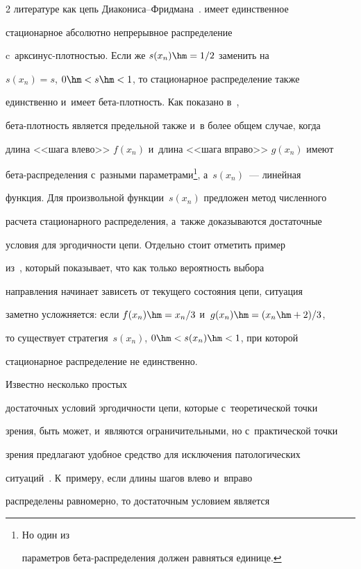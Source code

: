 \begin{multicols}{2}
{литературе как цепь Диа\-ко\-ни\-са--Фрид\-ма\-на~\cite{8-kr}.} имеет единственное 


стационарное абсолютно непрерывное распределение  


c~арк\-си\-нус-плот\-ностью. Если же $s(x_n)\hm=1/2$ заменить на 


$s(x_n)=s$, $0\hm<s\hm<1$, то стационарное распределение также 


единственно и~имеет бе\-та-плот\-ность. Как показано в~\cite{4-kr},  


бе\-та-плот\-ность является предельной так\-же и~в более общем случае, когда 


длина <<шага влево>> $f(x_n)$ и~длина <<шага вправо>> $g(x_n)$ имеют  


бе\-та-рас\-пре\-де\-ле\-ния с~разными па\-ра\-мет\-ра\-ми\footnote[1]{Но один из 


параметров бета-распределения должен равняться единице.}, а~$s(x_n)$~--- линейная 


функция. Для произвольной функции~$s(x_n)$ предложен метод чис\-лен\-но\-го 


расчета стационарного распределения, а~так\-же доказываются достаточные 


условия для эргодичности цепи. Отдельно стоит отметить пример 


из~\cite{11-kr}, который показывает, что как только ве\-ро\-ят\-ность выбора 


на\-прав\-ле\-ния начинает зависеть от текущего со\-сто\-яния цепи, ситуация 


заметно услож\-ня\-ет\-ся: если $f(x_n)\hm= x_n/3$ и~$g(x_n)\hm= (x_n\hm+2)/3$, 


то существует стратегия~$s(x_n)$, $0\hm< s(x_n)\hm<1$, при которой 


стационарное распределение не единственно. 


%


Известно несколько простых 


достаточных условий эргодичности цепи, которые с~тео\-ре\-ти\-че\-ской точ\-ки 


зрения, быть может, и~являются ограничительными, но с~практической точки 


зрения предлагают удобное средство для исключения патологических 


ситуаций~\cite{3-kr, 4-kr}. К~примеру, если длины шагов влево и~вправо 


распределены равномерно, то достаточным условием является 



\end{multicols}
